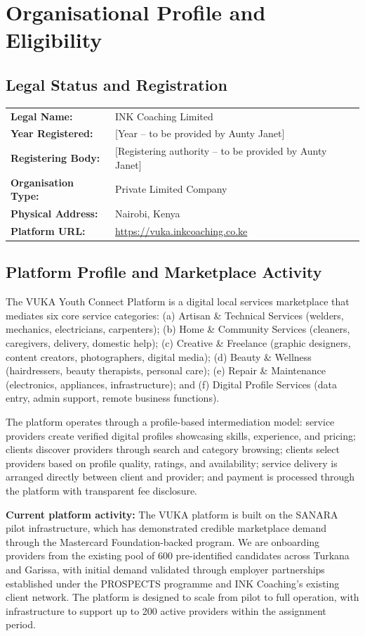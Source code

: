 \documentclass[11pt,a4paper]{article}
\begin{document}
\section{Organisational Profile and Eligibility}
\subsection{Legal Status and Registration}
\begin{tabular}{@{}ll@{}}
\textbf{Legal Name:} & INK Coaching Limited \\
\textbf{Year Registered:} & [Year -- to be provided by Aunty Janet] \\
\textbf{Registering Body:} & [Registering authority -- to be provided by Aunty Janet] \\
\textbf{Organisation Type:} & Private Limited Company \\
\textbf{Physical Address:} & Nairobi, Kenya \\
\textbf{Platform URL:} & \url{https://vuka.inkcoaching.co.ke} \\
\end{tabular}

\subsection{Platform Profile and Marketplace Activity}
The VUKA Youth Connect Platform is a digital local services marketplace that mediates six core service categories: (a) Artisan \& Technical Services (welders, mechanics, electricians, carpenters); (b) Home \& Community Services (cleaners, caregivers, delivery, domestic help); (c) Creative \& Freelance (graphic designers, content creators, photographers, digital media); (d) Beauty \& Wellness (hairdressers, beauty therapists, personal care); (e) Repair \& Maintenance (electronics, appliances, infrastructure); and (f) Digital Profile Services (data entry, admin support, remote business functions).

\noindent The platform operates through a profile-based intermediation model: service providers create verified digital profiles showcasing skills, experience, and pricing; clients discover providers through search and category browsing; clients select providers based on profile quality, ratings, and availability; service delivery is arranged directly between client and provider; and payment is processed through the platform with transparent fee disclosure.

\noindent \textbf{Current platform activity:} The VUKA platform is built on the SANARA pilot infrastructure, which has demonstrated credible marketplace demand through the Mastercard Foundation-backed program. We are onboarding providers from the existing pool of 600 pre-identified candidates across Turkana and Garissa, with initial demand validated through employer partnerships established under the PROSPECTS programme and INK Coaching's existing client network. The platform is designed to scale from pilot to full operation, with infrastructure to support up to 200 active providers within the assignment period.
\end{document}
